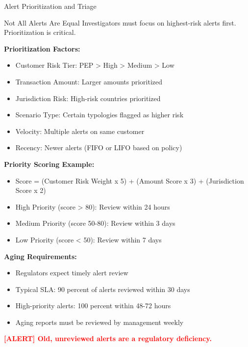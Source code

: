 \documentclass[11pt,a4paper]{beamer}
\newcommand{\redflag}[1]{\textcolor{red}{\textbf{[ALERT] #1}}}
\begin{document}
	\begin{frame}{Alert Prioritization and Triage}
	\begin{block}{Not All Alerts Are Equal}
		Investigators must focus on highest-risk alerts first. Prioritization is critical.
	\end{block}
	
	\textbf{Prioritization Factors:}
	\begin{itemize}
		\item Customer Risk Tier: PEP > High > Medium > Low
		\item Transaction Amount: Larger amounts prioritized
		\item Jurisdiction Risk: High-risk countries prioritized
		\item Scenario Type: Certain typologies flagged as higher risk
		\item Velocity: Multiple alerts on same customer
		\item Recency: Newer alerts (FIFO or LIFO based on policy)
	\end{itemize}
	
	\textbf{Priority Scoring Example:}
	\begin{itemize}
		\item Score = (Customer Risk Weight x 5) + (Amount Score x 3) + (Jurisdiction Score x 2)
		\item High Priority (score > 80): Review within 24 hours
		\item Medium Priority (score 50-80): Review within 3 days
		\item Low Priority (score < 50): Review within 7 days
	\end{itemize}
	
	\textbf{Aging Requirements:}
	\begin{itemize}
		\item Regulators expect timely alert review
		\item Typical SLA: 90 percent of alerts reviewed within 30 days
		\item High-priority alerts: 100 percent within 48-72 hours
		\item Aging reports must be reviewed by management weekly
	\end{itemize}
	
	\redflag{Old, unreviewed alerts are a regulatory deficiency.}
	\end{frame}
	
\end{document}
